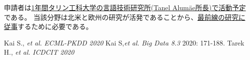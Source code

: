 申請者は\underline{1年間タリン工科大学の言語技術研究所(Tanel Alumäe所長)で活動予定}である。
当該分野は北米と欧州の研究が活発であることから、\underline{最前線の研究に従事}するために必要である。

\vspace{1cm}
{\footnotesize 
\begin{twobibliography}{99}
    \setlength{\parskip}{0cm}
    \setlength{\itemsep}{0cm}
     Kai S., \textit{et al.} \textit{ECML-PKDD 2020}
     Kai S,\textit{et al.} \textit{Big Data 8.3} 2020: 171-188.
     Tarek H., \textit{et al.} \textit{ICDCIT 2020}
\end{twobibliography}
}


